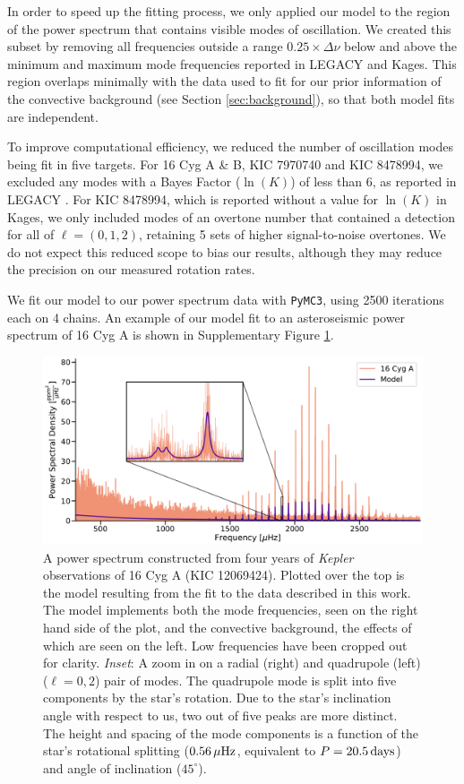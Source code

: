 \documentclass[12pt]{article}
\newcommand{\kepler}{\emph{Kepler}\xspace}
\begin{document}
In order to speed up the fitting process, we only applied our model to the region of the power spectrum that contains visible modes of oscillation. We created this subset by removing all frequencies outside a range $0.25 \times \Delta\nu$ below and above the minimum and maximum mode frequencies reported in LEGACY and Kages. This region overlaps minimally with the data used to fit for our prior information of the convective background (see Section \ref{sec:background}), so that both model fits are independent.

To improve computational efficiency, we reduced the number of oscillation modes being fit in five targets. For 16 Cyg A \& B, KIC 7970740 and KIC 8478994, we excluded any modes with a Bayes Factor ($\ln(K)$) of less than 6, as reported in LEGACY \cite{davies+2016,lund+2017,kass+raftery1995}. For KIC 8478994, which is reported without a value for $\ln(K)$ in Kages, we only included modes of an overtone number that contained a detection for all of $\ell = (0, 1, 2)$, retaining 5 sets of higher signal-to-noise overtones. We do not expect this reduced scope to bias our results, although they may reduce the precision on our measured rotation rates.

We fit our model to our power spectrum data with \texttt{PyMC3}, using 2500 iterations each on 4 chains. An example of our model fit to an asteroseismic power spectrum of 16 Cyg A is shown in Supplementary Figure \ref{fig:modelfit}.

 \begin{figure}
	\centering
	\includegraphics[width=.99\textwidth]{Images/modelfit.pdf}
	\caption{A power spectrum constructed from four years of \kepler observations of 16 Cyg A (KIC 12069424). Plotted over the top is the model resulting from the fit to the data described in this work. The model implements both the mode frequencies, seen on the right hand side of the plot, and the convective background, the effects of which are seen on the left. Low frequencies have been cropped out for clarity. \textit{Inset}: A zoom in on a radial (right) and quadrupole (left) ($\ell = 0, 2$) pair of modes. The quadrupole mode is split into five components by the star's rotation. Due to the star's inclination angle with respect to us, two out of five peaks are more distinct. The height and spacing of the mode components is a function of the star's rotational splitting ($0.56\, \mu\rm{Hz}$, equivalent to $P = 20.5\, \rm{days}$) and angle of inclination ($45^\circ$).}
	\label{fig:modelfit}
\end{figure}
\end{document}
